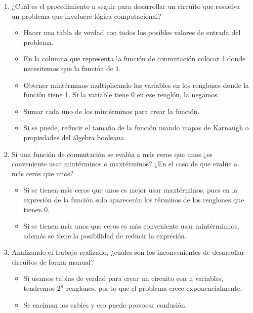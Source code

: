 \documentclass{article}
\begin{document}
\begin{enumerate}[1.]
	\item ¿Cuál es el procedimiento a seguir para desarrollar un circuito que resuelva un problema que involucre lógica computacional?
	\begin{itemize}
        \item Hacer una tabla de verdad con todos los posibles valores de entrada del problema.
        \item En la columna que representa la función de conmutación colocar 1 donde necesitemos que la función de 1.
        \item Obtener mintérminos multiplicando las variables en los renglones donde la función tiene 1. Si la variable tiene 0 en ese renglón, la negamos.
        \item Sumar cada uno de los mintérminos para crear la función.
        \item Si se puede, reducir el tamaño de la función usando mapas de Karnaugh o propiedades del álgebra booleana.
	\end{itemize}
	
	\item Si una función de conmutación se evalúa a más ceros que unos ¿es conveniente usar mintérminos o maxtérminos? ¿En el caso de que evalúe a más ceros que unos?
	\begin{itemize}
		\item Si se tienen más ceros que unos es mejor usar maxtérminos, pues en la expresión de la función solo aparecerán los términos de los renglones que tienen 0.
		\item Si se tienen más unos que ceros es más conveniente usar mintérminnos, además se tiene la posibilidad de reducir la expresión.
	\end{itemize}
	
	\item Analizando el trabajo realizado, ¿cuáles son los inconvenientes de desarrollar circuitos de forma manual?
	\begin{itemize}
		 \item Si usamos tablas de verdad para crear un circuito con n variables, tendremos $2^{n}$ renglones, por lo que el problema crece exponencialmente.
		 \item Se enciman los cables y eso puede provocar confusión.
	\end{itemize}
\end{enumerate}
\end{document}

